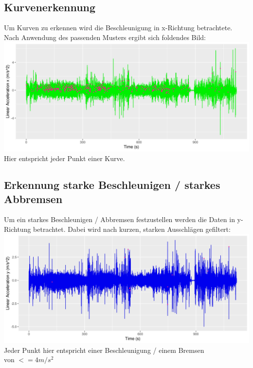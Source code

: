 \documentclass{article}
\begin{document}
\begin{multicols*}{3}
   \subsection*{Kurvenerkennung}
   Um Kurven zu erkennen wird die Beschleunigung in x-Richtung betrachtete. Nach Anwendung des passenden Musters ergibt sich foldendes Bild:
   \includegraphics[width=\linewidth]{../images/Calculations_cell_7_output_0}
   Hier entspricht jeder Punkt einer Kurve.
   \vfill\null
   \columnbreak
   \subsection*{Erkennung starke Beschleunigen / starkes Abbremsen}
   Um ein starkes Beschleunigen / Abbremsen festzustellen werden die Daten in y-Richtung betrachtet. Dabei wird nach kurzen, starken Ausschlägen gefiltert:
   \includegraphics[width=\linewidth]{../images/Calculations_cell_8_output_0}
   Jeder Punkt hier entspricht einer Beschleunigung / einem Bremsen\\ von $<=4m/s^{2}$

\end{multicols*}
\end{document}
